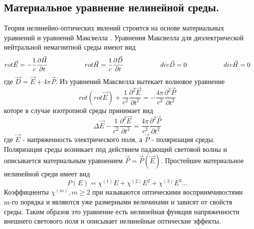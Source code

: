 \subsection{Материальное уравнение нелинейной среды.} 
\hspace*{2mm}
Теория нелинейно-оптических явлений строится на основе материальных уравнений и уравнений Максвелла  \cite{achmanov2}. Уравнения Максвелла для диэлектрической нейтральной немагнитной среды имеют вид
\begin{equation}\label{1:maxvel}
rot\vec{E} = - \frac{ 1 }{ c}\frac{\partial \vec{H} }{\partial t}
\hspace{20mm}
rot\vec{H} =  \frac{ 1 }{ c}\frac{\partial \vec{D} }{\partial t}
\hspace{20mm}
div\vec{D} = 0
\hspace{20mm}
div\vec{H} = 0
\end{equation}где $ \vec{D} = \vec{E} + 4\pi \vec{P}$. Из уравнений Максвелла вытекает волновое уравнение
\begin{equation}\label{1:rot_maxvel}
rot(rot\vec{E}) + \frac{ 1 }{ c^2 }\frac{\partial^2 \vec{E} }{\partial t^2} = - \frac{ 4\pi }{ c^2 }\frac{\partial^2 \vec{P} }{\partial t^2}
\end{equation}которе в случае изотропной среды принимает вид
\begin{equation}\label{1:wave_eq}
\Delta\vec{E} - \frac{ 1 }{ c^2 }\frac{\partial^2 \vec{E} }{\partial t^2} =  \frac{ 4\pi }{ c^2 }\frac{\partial^2 \vec{P} }{\partial t^2}
\end{equation}
где $\vec{E}$ - напряженность электрического поля, а $\vec{P}$ - поляризация среды. Поляризация среды возникает под действием падающий световой волны и описывается материальным уравнением $\vec{P} = \vec{P}(\vec{E})$. Простейшее материальное нелинейной среди имеет вид
\begin{equation}\label{1:p_1}
P(E) = \chi^{(1)}E + \chi^{(2)}E^2 +\chi^{(3)}E^3\dots
\end{equation}
Коэффициенты $\chi^{(m)}, m \ge 2$ при  называются оптическими восприимчивостями m-го порядка и являются уже размерными величинами и зависят от свойств среды. Таким образов это уравнение есть нелинейная функция напряженности внешнего светового поля и описывает нелинейные оптические эффекты. 

